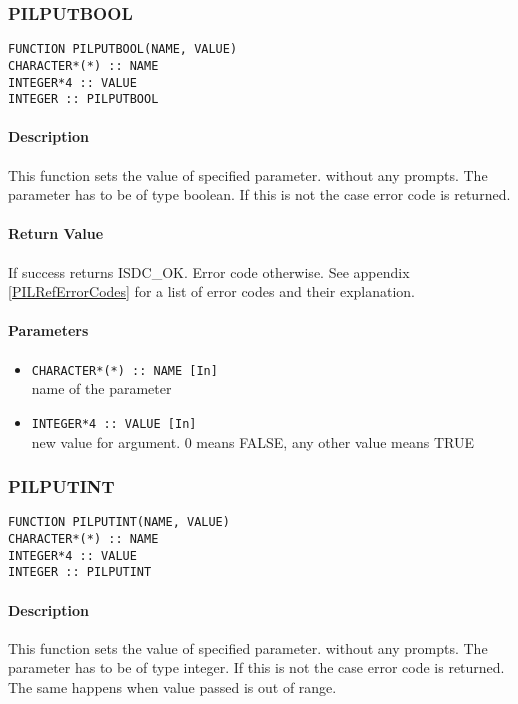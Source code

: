 \subsubsection{PILPUTBOOL}

\begin{verbatim}
FUNCTION PILPUTBOOL(NAME, VALUE) 
CHARACTER*(*) :: NAME 
INTEGER*4 :: VALUE 
INTEGER :: PILPUTBOOL 
\end{verbatim}

\paragraph{Description\\}
This function sets the value of specified parameter. without any prompts.
The parameter has to be of type
boolean. If this is not the case error code is returned. 
  
\paragraph{Return Value\\}
If success returns ISDC\_OK. Error code otherwise. See appendix \ref{PILRefErrorCodes}
for a list of error codes and their explanation.

\paragraph{Parameters}
\begin{itemize}
\item
{\tt CHARACTER*(*) :: NAME [In] } \\
name of the parameter 
\item
{\tt INTEGER*4 :: VALUE [In] } \\
new value for argument. 0 means FALSE, any other value means TRUE 
\end{itemize}


\subsubsection{PILPUTINT}

\begin{verbatim}
FUNCTION PILPUTINT(NAME, VALUE) 
CHARACTER*(*) :: NAME 
INTEGER*4 :: VALUE 
INTEGER :: PILPUTINT 
\end{verbatim}

\paragraph{Description\\}
This function sets the value of specified parameter. without any prompts.
The parameter has to be of type
integer. If this is not the case error code is returned. The same happens
when value passed is out of range. 

